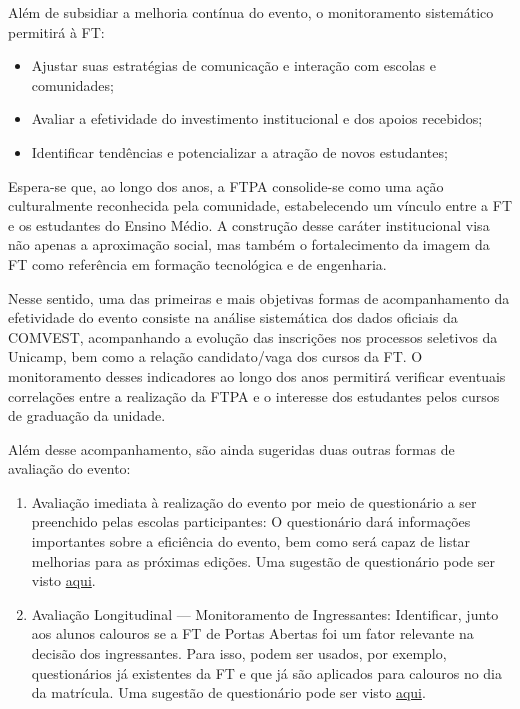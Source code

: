 \documentclass[
  letterpaper,
  DIV=11,
  numbers=noendperiod]{scrreprt}
\begin{document}
Além de subsidiar a melhoria contínua do evento, o monitoramento
sistemático permitirá à FT:

\begin{itemize}
\item
  Ajustar suas estratégias de comunicação e interação com escolas e
  comunidades;
\item
  Avaliar a efetividade do investimento institucional e dos apoios
  recebidos;
\item
  Identificar tendências e potencializar a atração de novos estudantes;
\end{itemize}

Espera-se que, ao longo dos anos, a FTPA consolide-se como uma ação
culturalmente reconhecida pela comunidade, estabelecendo um vínculo
entre a FT e os estudantes do Ensino Médio. A construção desse caráter
institucional visa não apenas a aproximação social, mas também o
fortalecimento da imagem da FT como referência em formação tecnológica e
de engenharia.

Nesse sentido, uma das primeiras e mais objetivas formas de
acompanhamento da efetividade do evento consiste na análise sistemática
dos dados oficiais da COMVEST, acompanhando a evolução das inscrições
nos processos seletivos da Unicamp, bem como a relação candidato/vaga
dos cursos da FT. O monitoramento desses indicadores ao longo dos anos
permitirá verificar eventuais correlações entre a realização da FTPA e o
interesse dos estudantes pelos cursos de graduação da unidade.

Além desse acompanhamento, são ainda sugeridas duas outras formas de
avaliação do evento:

\begin{enumerate}
\def\labelenumi{\arabic{enumi}.}
\item
  Avaliação imediata à realização do evento por meio de questionário a
  ser preenchido pelas escolas participantes: O questionário dará
  informações importantes sobre a eficiência do evento, bem como será
  capaz de listar melhorias para as próximas edições. Uma sugestão de
  questionário pode ser visto \href{questionario-1.txt}{aqui}.
\item
  Avaliação Longitudinal --- Monitoramento de Ingressantes: Identificar,
  junto aos alunos calouros se a FT de Portas Abertas foi um fator
  relevante na decisão dos ingressantes. Para isso, podem ser usados,
  por exemplo, questionários já existentes da FT e que já são aplicados
  para calouros no dia da matrícula. Uma sugestão de questionário pode
  ser visto \href{./questionario-2.txt}{aqui}.
\end{enumerate}
\end{document}
